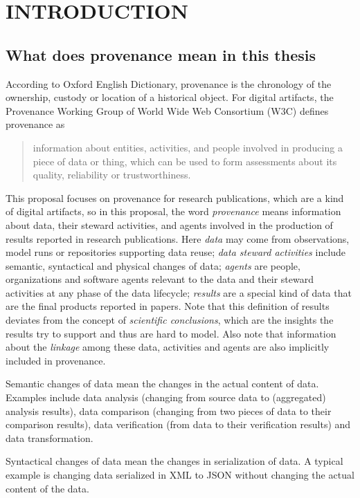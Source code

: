 \chapter{INTRODUCTION}
\label{introduction}
\section{What does provenance mean in this thesis}
According to Oxford English Dictionary, provenance is the chronology of the ownership, custody or 
location of a historical object. For digital artifacts, the Provenance Working Group of World Wide 
Web Consortium (W3C) defines provenance as \begin{quote}information about entities, activities, and 
people involved in producing a piece of data or thing, which can be used to form assessments about 
its quality, reliability or trustworthiness.\end{quote} This proposal focuses on provenance for 
research publications, which are a kind of digital artifacts, so in this proposal, the word 
\emph{provenance} means information about data, their steward activities, and agents involved in the 
production of results reported in research publications. Here \emph{data} may come from observations, 
model runs or repositories supporting data reuse; \emph{data steward activities} include semantic, 
syntactical and physical changes of data; \emph{agents} are people, organizations and software agents 
relevant to the data and their steward activities at any phase of the data lifecycle; \emph{results} 
are a special kind of data that are the final products reported in papers. Note that this definition 
of results deviates from the concept of \emph{scientific conclusions}, which are the insights the results try to support and thus are hard to model. Also note that information about the \emph{linkage} among these data, activities and agents are also implicitly included in provenance.

Semantic changes of data mean the changes in the actual content of data. Examples include data 
analysis (changing from source data to (aggregated) analysis results), data comparison (changing from 
two pieces of data to their comparison results), data verification (from data to their verification 
results) and data transformation. 

Syntactical changes of data mean the changes in serialization of data. A typical example is changing 
data serialized in XML to JSON without changing the actual content of the data.


